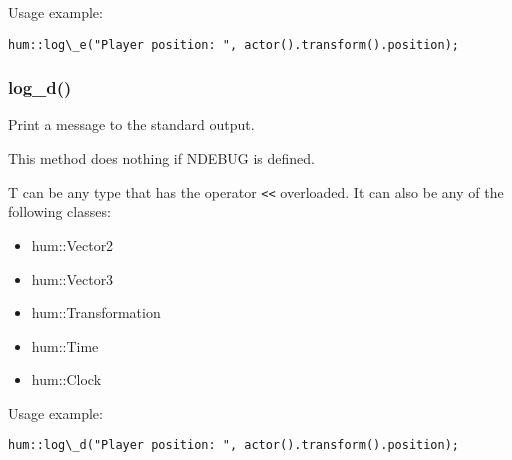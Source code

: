 Usage example:
\begin{lstlisting}[caption= log\_e() example]
hum::log\_e("Player position: ", actor().transform().position);
\end{lstlisting}

\subsubsection{log\_d()}
Print a message to the standard output.

This method does nothing if NDEBUG is defined.

T can be any type that has the operator \texttt{<<} overloaded.
It can also be any of the following classes:
\begin{itemize}
\item hum::Vector2
\item hum::Vector3
\item hum::Transformation
\item hum::Time
\item hum::Clock
\end{itemize}

Usage example:
\begin{lstlisting}[caption=log\_d() example]
hum::log\_d("Player position: ", actor().transform().position);
\end{lstlisting}
